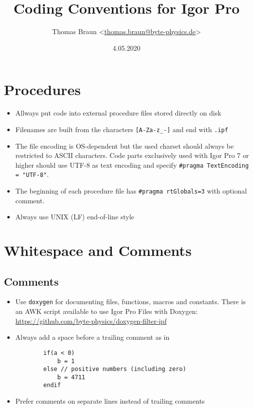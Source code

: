 \documentclass{scrartcl}
\date{4.05.2020}
\author{Thomas Braun <\url{thomas.braun@byte-physics.de}>}
\title{Coding Conventions for Igor Pro}
\begin{document}
%
\maketitle
%
\section{Procedures}
%
\begin{itemize}
	\item Allways put code into external procedure files stored directly on disk
%
	\item Filenames are built from the characters \texttt{[A-Za-z_-]} and end with \texttt{.ipf}
%
	\item The file encoding is OS-dependent but the used charset should always be restricted to ASCII characters.
		  Code parts exclusively used with Igor Pro 7 or higher should use UTF-8 as text encoding and specify \texttt{#pragma TextEncoding = "UTF-8"}.
%
	\item The beginning of each procedure file has \texttt{#pragma rtGlobals=3} with optional comment.
%
	\item Always use UNIX (LF) end-of-line style
\end{itemize}
%
\section{Whitespace and Comments}
%
\subsection*{Comments}
%
\begin{itemize}
	\item Use \texttt{doxygen} for documenting files, functions, macros and constants.\newline
	There is an AWK script available to use Igor Pro Files with Doxygen:\newline
	\url{https://github.com/byte-physics/doxygen-filter-ipf}
%
	\item Always add a space before a trailing comment as in
	\begin{verbatim}
		if(a < 0)
			b = 1
		else // positive numbers (including zero)
			b = 4711
		endif
	\end{verbatim}
%
	\item Prefer comments on separate lines instead of trailing comments
%
\end{itemize}
%
\end{document}
